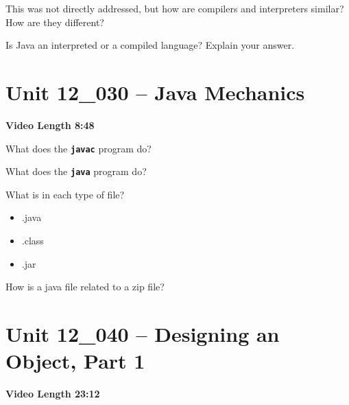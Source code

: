 \documentclass[letterpaper,12pt]{exam}
\newcommand{\unit}{Unit 12}
\begin{document}
\begin{questions}
\begin{samepage}
    \question This was not directly addressed, but how are compilers and interpreters similar?  How are they different?
    \vspace{15mm}
\end{samepage}

\begin{samepage}
    \question Is Java an interpreted or a compiled language?  Explain your answer.
    \vspace{15mm}
\end{samepage}


\section*{\unit\_030 -- Java Mechanics} 
\par{\selectfont\textbf{Video Length 8:48}}

\begin{samepage}
    \question What does the \texttt{\textbf{javac}} program do?
    \vspace{5mm}
\end{samepage}

\begin{samepage}
    \question What does the \texttt{\textbf{java}} program do?
    \vspace{5mm}
\end{samepage}
\begin{samepage}
    \question What is in each type of file?
      \begin{itemize}
        \item .java
        \vspace{5mm}
        \item .class
        \vspace{5mm}
        \item .jar
        \vspace{5mm}
       \end{itemize}
\end{samepage}

\begin{samepage}
    \question How is a java file related to a zip file?
    \vspace{5mm}
\end{samepage}

\section*{\unit\_040 -- Designing an Object, Part 1} 
\par{\selectfont\textbf{Video Length 23:12}}


\end{questions}
\end{document}

